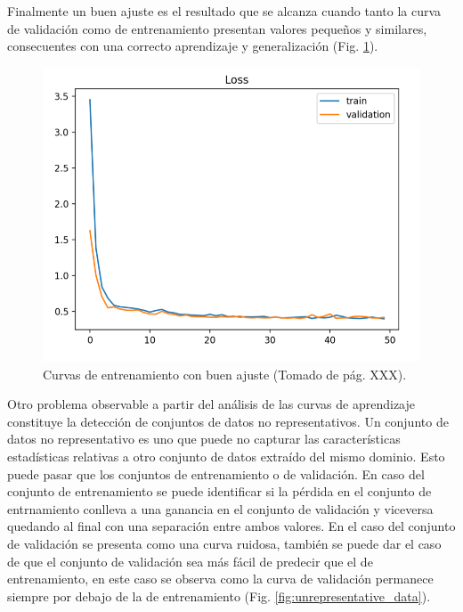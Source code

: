 Finalmente un buen ajuste es el resultado que se alcanza cuando tanto la curva de validación como de entrenamiento
presentan valores pequeños y similares, consecuentes con una correcto aprendizaje y generalización (Fig. \ref{fig:good_fit}).

\begin{figure}[h!]
	\begin{center}
		\begin{center}
			\includegraphics[scale=.3]{Graphics/good_fit.png}
        \end{center}
	    \caption{Curvas de entrenamiento con buen ajuste (Tomado de \cite{brownlee2018better} pág. XXX).}\label{fig:good_fit}
	\end{center}
\end{figure}

Otro problema observable a partir del análisis de las curvas de aprendizaje constituye la detección de conjuntos
de datos no representativos. Un conjunto de datos no representativo es uno que puede no 
capturar las características estadísticas relativas a otro conjunto de datos extraído del mismo dominio.
Esto puede pasar que los conjuntos de entrenamiento o de validación. En caso del conjunto de entrenamiento
se puede identificar si la pérdida en el conjunto de entrnamiento conlleva a una ganancia en el conjunto de 
validación y viceversa quedando al final con una separación entre ambos valores. En el caso del conjunto de 
validación se presenta como una curva ruidosa, también se puede dar el caso de que el conjunto  de validación
sea más fácil de predecir que el de entrenamiento, en este caso se observa como la curva de validación permanece
siempre por debajo de la de entrenamiento (Fig. \ref{fig:unrepresentative_data}).

